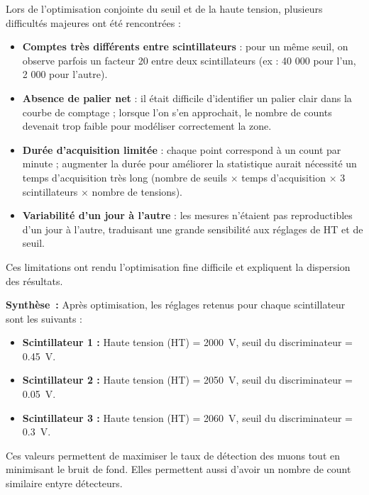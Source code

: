 \documentclass[a4paper,12pt,twoside]{article}
\begin{document}

\vspace{1em}
\begin{center}
\begin{tcolorbox}[colback=red!5!white, colframe=red!80!black, title=Problèmes rencontrés lors de l'optimisation]
Lors de l’optimisation conjointe du seuil et de la haute tension, plusieurs difficultés majeures ont été rencontrées :
\begin{itemize}
    \item \textbf{Comptes très différents entre scintillateurs} : pour un même seuil, on observe parfois un facteur 20 entre deux scintillateurs (ex : 40 000 pour l’un, 2 000 pour l’autre).
    \item \textbf{Absence de palier net} : il était difficile d’identifier un palier clair dans la courbe de comptage ; lorsque l’on s’en approchait, le nombre de counts devenait trop faible pour modéliser correctement la zone.
    \item \textbf{Durée d’acquisition limitée} : chaque point correspond à un count par minute ; augmenter la durée pour améliorer la statistique aurait nécessité un temps d’acquisition très long (nombre de seuils $\times$ temps d’acquisition $\times$ 3 scintillateurs $\times$ nombre de tensions).
    \item \textbf{Variabilité d’un jour à l’autre} : les mesures n’étaient pas reproductibles d’un jour à l’autre, traduisant une grande sensibilité aux réglages de HT et de seuil.
\end{itemize}
Ces limitations ont rendu l’optimisation fine difficile et expliquent la dispersion des résultats.
\end{tcolorbox}
\end{center}


\begin{remarque}
\textbf{Synthèse~:} Après optimisation, les réglages retenus pour chaque scintillateur sont les suivants :
\begin{itemize}
    \item \textbf{Scintillateur 1 :} Haute tension (HT) = 2000~V, seuil du discriminateur = 0.45~V.
    \item \textbf{Scintillateur 2 :} Haute tension (HT) = 2050~V, seuil du discriminateur = 0.05~V.
    \item \textbf{Scintillateur 3 :} Haute tension (HT) = 2060~V, seuil du discriminateur = 0.3~V.
\end{itemize}
Ces valeurs permettent de maximiser le taux de détection des muons tout en minimisant le bruit de fond. Elles permettent aussi d'avoir un nombre de count similaire entyre détecteurs.
\end{remarque}
\end{document}
